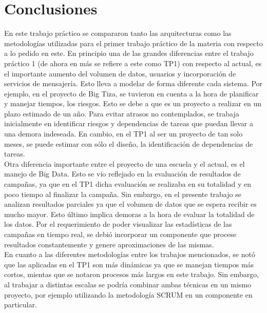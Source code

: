 \section{Conclusiones}

En este trabajo práctico se compararon tanto las arquitecturas como las metodologías utilizadas para el primer trabajo práctico de la materia con respecto a lo pedido en este.
En principio una de las grandes diferencias entre el trabajo práctico 1 (de ahora en más se refiere a este como TP1) con respecto al actual, es el importante aumento del volumen de datos, usuarios y incorporación de servicios de mensajería. 
Esto lleva a modelar de forma diferente cada sistema. Por ejemplo, en el proyecto de Big Tiza, se tuvieron en cuenta a la hora de planificar y manejar tiempos, los riesgos. Esto se debe a que es un proyecto a realizar en un plazo estimado de un año. Para evitar atrasos no contemplados, se trabaja inicialmente en identificar riesgos y dependencias de tareas que puedan llevar a una demora indeseada. En cambio, en el TP1 al ser un proyecto de tan solo meses, se puede estimar con sólo el diseño, la identificación de dependencias de tareas. \\
Otra diferencia importante entre el proyecto de una escuela y el actual, es el manejo de Big Data. Esto se vio reflejado en la evaluación de resultados de campañas, ya que en el TP1 dicha evaluación se realizaba en su totalidad y en poco tiempo al finalizar la campaña. Sin embargo, en el presente trabajo se analizan resultados parciales ya que el volumen de datos que se espera recibir es mucho mayor. Esto último implica demoras a la hora de evaluar la totalidad de los datos. Por el requerimiento de poder visualizar las estadísticas de las campañas en tiempo real, se debió incorporar un componente que procese resultados constantemente y genere aproximaciones de las mismas. \\
En cuanto a las diferentes metodologías entre los trabajos mencionados, se notó que las aplicadas en el TP1 son más dinámicas ya que se manejan tiempos más cortos, mientas que se notaron procesos más largos en este trabajo. Sin embargo, al trabajar a distintas escalas se podría combinar ambas técnicas en un mismo proyecto, por ejemplo utilizando la metodología SCRUM en un componente en particular. 

